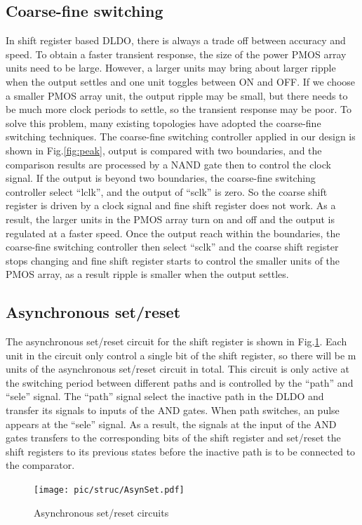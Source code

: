 \documentclass[journal]{IEEEtran}
\begin{document}
\subsection{Coarse-fine switching}
In shift register based DLDO, there is always a trade off between accuracy and speed. To obtain a faster transient response, the size of the power PMOS array units need to be large. However, a larger units may bring about larger ripple when the output settles and one unit toggles between ON and OFF. If we choose a smaller PMOS array unit, the output ripple may be small, but there needs to be much more clock periods to settle, so the transient response may be poor. To solve this problem, many existing topologies have adopted the coarse-fine switching techniques\cite{pipeline,coarse-fine,AALDO1}. The coarse-fine switching controller applied in our design is shown in Fig.\ref{fig:peak}, output is compared with two boundaries, and the comparison results are processed by a NAND gate then to control the clock signal. If the output is beyond two boundaries, the coarse-fine switching controller select ``lclk'', and the output of ``sclk'' is zero. So the coarse shift register is driven by a clock signal and fine shift register does not work. As a result, the larger units in the PMOS array turn on and off and the output is regulated at a faster speed. Once the output reach within the boundaries, the coarse-fine switching controller then select ``sclk'' and the coarse shift register stops changing and fine shift register starts to control the smaller units of the PMOS array, as a result ripple is smaller when the output settles.
\subsection{Asynchronous set/reset}
The asynchronous set/reset circuit for the shift register is shown in Fig.\ref{fig:Asyn}. Each unit in the circuit only control a single bit of the shift register, so there will be m units of the asynchronous set/reset circuit in total. This circuit is only active at the switching period between different paths and is controlled by the ``path'' and ``sele'' signal. The ``path'' signal select the inactive path in the DLDO and transfer its signals to inputs of the AND gates. When path switches, an pulse appears at the ``sele'' signal. As a result, the signals at the input of the AND gates transfers to the corresponding bits of the shift register and set/reset the shift registers to its previous states before the inactive path is to be connected to the comparator.
\begin{figure}[t!]
    \centering
    \texttt{[image: pic/struc/AsynSet.pdf]}
    \caption{Asynchronous set/reset circuits}
    \label{fig:Asyn}
\end{figure}
\end{document}
